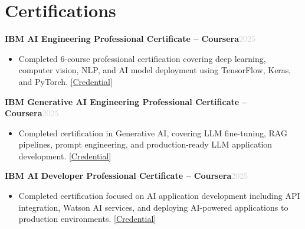 \documentclass[a4paper,10.5pt]{article}
\newcommand{\resumeProject}[2]{%
  \vspace{3pt}%
  \noindent\textbf{\normalsize #1}\hfill\textcolor{lightgray}{\small #2}%
  \vspace{1pt}%
}
\newcommand{\resumeItem}[1]{%
  \item\small{#1}%
}
\newcommand{\resumeItemListStart}{%
  \begin{itemize}[leftmargin=0.18in, itemsep=2pt, topsep=3pt, parsep=0pt]%
}
\newcommand{\resumeItemListEnd}{%
  \end{itemize}\vspace{2pt}%
}
\begin{document}
\section{Certifications}

\resumeProject
  {IBM AI Engineering Professional Certificate -- Coursera}{2025}

\resumeItemListStart
  \resumeItem{
    Completed 6-course professional certification covering deep learning, computer vision, NLP, and AI model deployment using TensorFlow, Keras, and PyTorch. \href{https://www.coursera.org/account/accomplishments/professional-cert/VB5L09HRGVN4}{[Credential]}
  }
\resumeItemListEnd

\vspace{4pt}

\resumeProject
  {IBM Generative AI Engineering Professional Certificate -- Coursera}{2025}

\resumeItemListStart
  \resumeItem{
    Completed certification in Generative AI, covering LLM fine-tuning, RAG pipelines, prompt engineering, and production-ready LLM application development. \href{https://www.coursera.org/account/accomplishments/professional-cert/W9RRBKQ7I5YZ}{[Credential]}
  }
\resumeItemListEnd

\vspace{4pt}

\resumeProject
  {IBM AI Developer Professional Certificate -- Coursera}{2025}

\resumeItemListStart
  \resumeItem{
    Completed certification focused on AI application development including API integration, Watson AI services, and deploying AI-powered applications to production environments. \href{https://www.coursera.org/account/accomplishments/professional-cert/9Z5UYZMG8HPX}{[Credential]}
  }
\resumeItemListEnd

\end{document}
